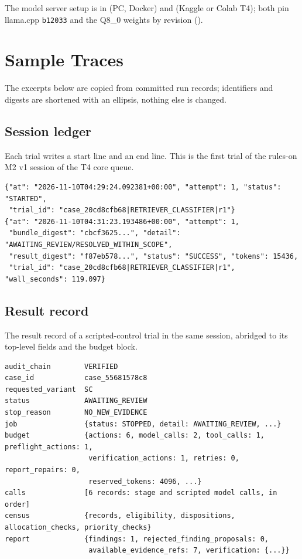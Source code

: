 The model server setup is in  (PC, Docker) and
 (Kaggle or Colab T4); both pin llama.cpp
\texttt{b12033} and the Q8\_0 weights by revision ().

\chapter{Sample Traces}
\label{app:traces}
The excerpts below are copied from committed run records; identifiers and digests are shortened
with an ellipsis, nothing else is changed.

\section{Session ledger}
Each trial writes a start line and an end line. This is the first trial of the rules-on M2 v1
session of the T4 core queue.
\begin{lstlisting}[language={},numbers=none,caption={Ledger lines of one trial (\texttt{mg2-t4-core}, rules-on, M2 v1)},label={lst:ledger}]
{"at": "2026-11-10T04:29:24.092381+00:00", "attempt": 1, "status": "STARTED",
 "trial_id": "case_20cd8cfb68|RETRIEVER_CLASSIFIER|r1"}
{"at": "2026-11-10T04:31:23.193486+00:00", "attempt": 1,
 "bundle_digest": "cbcf3625...", "detail": "AWAITING_REVIEW/RESOLVED_WITHIN_SCOPE",
 "result_digest": "f87eb578...", "status": "SUCCESS", "tokens": 15436,
 "trial_id": "case_20cd8cfb68|RETRIEVER_CLASSIFIER|r1", "wall_seconds": 119.097}
\end{lstlisting}

\section{Result record}
The result record of a scripted-control trial in the same session, abridged to its top-level fields
and the budget block.
\begin{lstlisting}[language={},numbers=none,caption={Abridged result record (SC control, \texttt{case\_55681578c8})},label={lst:result}]
audit_chain        VERIFIED
case_id            case_55681578c8
requested_variant  SC
status             AWAITING_REVIEW
stop_reason        NO_NEW_EVIDENCE
job                {status: STOPPED, detail: AWAITING_REVIEW, ...}
budget             {actions: 6, model_calls: 2, tool_calls: 1, preflight_actions: 1,
                    verification_actions: 1, retries: 0, report_repairs: 0,
                    reserved_tokens: 4096, ...}
calls              [6 records: stage and scripted model calls, in order]
census             {records, eligibility, dispositions, allocation_checks, priority_checks}
report             {findings: 1, rejected_finding_proposals: 0,
                    available_evidence_refs: 7, verification: {...}}
\end{lstlisting}

